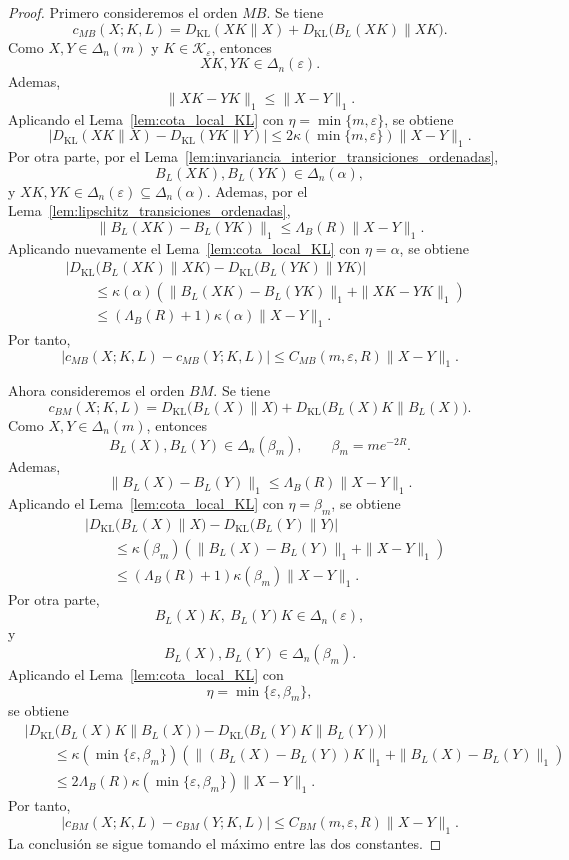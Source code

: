 \documentclass[12pt]{article}
\begin{document}
\begin{proof}
Primero consideremos el orden \(MB\). Se tiene
\[
c_{MB}(X;K,L)
=
D_{\mathrm{KL}}(XK\|X)
+
D_{\mathrm{KL}}\bigl(B_L(XK)\|XK\bigr).
\]
Como \(X,Y\in\Delta_n(m)\) y \(K\in\mathcal K_\varepsilon\), entonces
\[
XK,YK\in\Delta_n(\varepsilon).
\]
Ademas,
\[
\|XK-YK\|_1\le \|X-Y\|_1.
\]
Aplicando el Lema~\ref{lem:cota_local_KL} con \(\eta=\min\{m,\varepsilon\}\), se obtiene
\[
\left|
D_{\mathrm{KL}}(XK\|X)
-
D_{\mathrm{KL}}(YK\|Y)
\right|
\le
2\kappa(\min\{m,\varepsilon\})\|X-Y\|_1.
\]
Por otra parte, por el Lema~\ref{lem:invariancia_interior_transiciones_ordenadas},
\[
B_L(XK),B_L(YK)\in\Delta_n(\alpha),
\]
y \(XK,YK\in\Delta_n(\varepsilon)\subseteq\Delta_n(\alpha)\). Ademas, por el Lema~\ref{lem:lipschitz_transiciones_ordenadas},
\[
\|B_L(XK)-B_L(YK)\|_1
\le
\Lambda_B(R)\|X-Y\|_1.
\]
Aplicando nuevamente el Lema~\ref{lem:cota_local_KL} con \(\eta=\alpha\), se obtiene
\[
\begin{aligned}
&
\left|
D_{\mathrm{KL}}\bigl(B_L(XK)\|XK\bigr)
-
D_{\mathrm{KL}}\bigl(B_L(YK)\|YK\bigr)
\right|
\\
&\qquad
\le
\kappa(\alpha)
\left(
\|B_L(XK)-B_L(YK)\|_1
+
\|XK-YK\|_1
\right)
\\
&\qquad
\le
(\Lambda_B(R)+1)\kappa(\alpha)\|X-Y\|_1.
\end{aligned}
\]
Por tanto,
\[
|c_{MB}(X;K,L)-c_{MB}(Y;K,L)|
\le
C_{MB}(m,\varepsilon,R)\|X-Y\|_1.
\]

Ahora consideremos el orden \(BM\). Se tiene
\[
c_{BM}(X;K,L)
=
D_{\mathrm{KL}}\bigl(B_L(X)\|X\bigr)
+
D_{\mathrm{KL}}\bigl(B_L(X)K\|B_L(X)\bigr).
\]
Como \(X,Y\in\Delta_n(m)\), entonces
\[
B_L(X),B_L(Y)\in\Delta_n(\beta_m),
\qquad
\beta_m=me^{-2R}.
\]
Ademas,
\[
\|B_L(X)-B_L(Y)\|_1
\le
\Lambda_B(R)\|X-Y\|_1.
\]
Aplicando el Lema~\ref{lem:cota_local_KL} con \(\eta=\beta_m\), se obtiene
\[
\begin{aligned}
&
\left|
D_{\mathrm{KL}}\bigl(B_L(X)\|X\bigr)
-
D_{\mathrm{KL}}\bigl(B_L(Y)\|Y\bigr)
\right|
\\
&\qquad
\le
\kappa(\beta_m)
\left(
\|B_L(X)-B_L(Y)\|_1+\|X-Y\|_1
\right)
\\
&\qquad
\le
(\Lambda_B(R)+1)\kappa(\beta_m)\|X-Y\|_1.
\end{aligned}
\]
Por otra parte,
\[
B_L(X)K,\ B_L(Y)K\in\Delta_n(\varepsilon),
\]
y
\[
B_L(X),B_L(Y)\in\Delta_n(\beta_m).
\]
Aplicando el Lema~\ref{lem:cota_local_KL} con
\[
\eta=\min\{\varepsilon,\beta_m\},
\]
se obtiene
\[
\begin{aligned}
&
\left|
D_{\mathrm{KL}}\bigl(B_L(X)K\|B_L(X)\bigr)
-
D_{\mathrm{KL}}\bigl(B_L(Y)K\|B_L(Y)\bigr)
\right|
\\
&\qquad
\le
\kappa(\min\{\varepsilon,\beta_m\})
\left(
\|(B_L(X)-B_L(Y))K\|_1
+
\|B_L(X)-B_L(Y)\|_1
\right)
\\
&\qquad
\le
2\Lambda_B(R)\kappa(\min\{\varepsilon,\beta_m\})\|X-Y\|_1.
\end{aligned}
\]
Por tanto,
\[
|c_{BM}(X;K,L)-c_{BM}(Y;K,L)|
\le
C_{BM}(m,\varepsilon,R)\|X-Y\|_1.
\]
La conclusión se sigue tomando el máximo entre las dos constantes.
\end{proof}
\end{document}

